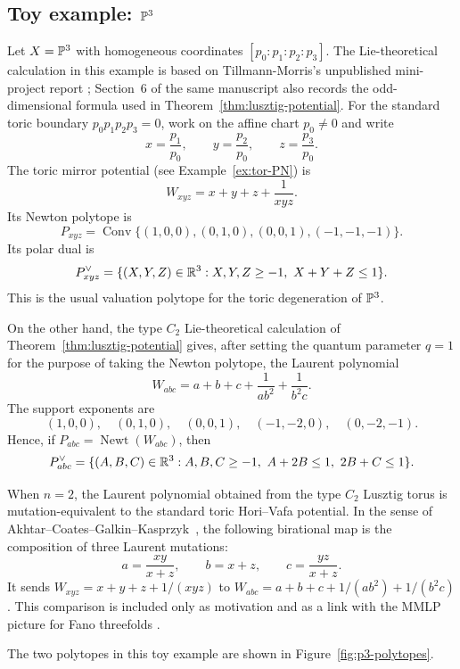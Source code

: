 \subsection{Toy example: \(\mathbb{P}^3\)}
Let \(X=\mathbb{P}^3\) with homogeneous coordinates \([p_0:p_1:p_2:p_3]\). The Lie-theoretical calculation in this example is based on Tillmann-Morris's unpublished mini-project report \cite{TillmannMorris}; Section~6 of the same manuscript also records the odd-dimensional formula used in Theorem~\ref{thm:lusztig-potential}. For the standard toric boundary \(p_0p_1p_2p_3=0\), work on the affine chart \(p_0\ne0\) and write
\[
x=\frac{p_1}{p_0},
\qquad
y=\frac{p_2}{p_0},
\qquad
z=\frac{p_3}{p_0}.
\]
The toric mirror potential (see Example~\ref{ex:tor-PN}) is
\[
W_{xyz}=x+y+z+\frac{1}{xyz}.
\]
Its Newton polytope is
\[
P_{xyz}
=
\operatorname{Conv}\{(1,0,0),(0,1,0),(0,0,1),(-1,-1,-1)\}.
\]
Its polar dual is
\[
P_{xyz}^\vee
=
\{(X,Y,Z)\in\mathbb{R}^3:
X,Y,Z\ge -1,\ X+Y+Z\le1\}.
\]
This is the usual valuation polytope for the toric degeneration of \(\mathbb{P}^3\).

On the other hand, the type \(C_2\) Lie-theoretical calculation of Theorem~\ref{thm:lusztig-potential} gives, after setting the quantum parameter \(q=1\) for the purpose of taking the Newton polytope, the Laurent polynomial
\[
W_{abc}
=
a+b+c+\frac{1}{ab^2}+\frac{1}{b^2c}.
\]
The support exponents are
\[
(1,0,0),\quad (0,1,0),\quad (0,0,1),
\quad (-1,-2,0),\quad (0,-2,-1).
\]
Hence, if \(P_{abc}=\operatorname{Newt}(W_{abc})\), then
\[
P_{abc}^\vee
=
\{(A,B,C)\in\mathbb{R}^3:
A,B,C\ge -1,\ A+2B\le1,\ 2B+C\le1\}.
\]

\begin{rmk}
When \(n=2\), the Laurent polynomial obtained from the type \(C_2\) Lusztig torus is mutation-equivalent to the standard toric Hori--Vafa potential. In the sense of Akhtar--Coates--Galkin--Kasprzyk~\cite{ACGK}, the following birational map is the composition of three Laurent mutations:
\[
a=\frac{xy}{x+z},\qquad
b=x+z,\qquad
c=\frac{yz}{x+z}.
\]
It sends \(W_{xyz}=x+y+z+1/(xyz)\) to \(W_{abc}=a+b+c+1/(ab^2)+1/(b^2c)\). This comparison is included only as motivation and as a link with the MMLP picture for Fano threefolds \cite{CKPT}.
\end{rmk}

The two polytopes in this toy example are shown in Figure~\ref{fig:p3-polytopes}.

